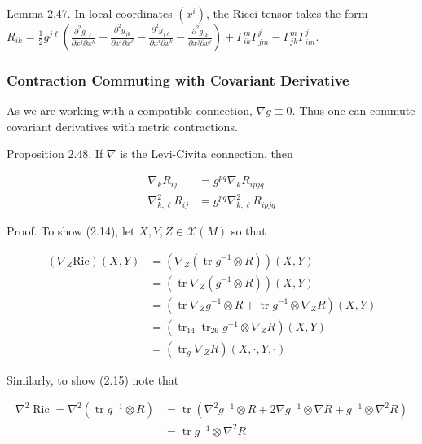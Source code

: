 \documentclass[10pt, letterpaper]{article}
\begin{document}
Lemma 2.47. In local coordinates $\left(x^{i}\right)$, the Ricci tensor takes the form\\
$R_{i k}=\frac{1}{2} g^{j \ell}\left(\frac{\partial^{2} g_{i \ell}}{\partial x^{j} \partial x^{k}}+\frac{\partial^{2} g_{j k}}{\partial x^{i} \partial x^{\ell}}-\frac{\partial^{2} g_{j \ell}}{\partial x^{i} \partial x^{k}}-\frac{\partial^{2} g_{i k}}{\partial x^{j} \partial x^{\ell}}\right)+\Gamma_{i k}^{m} \Gamma_{j m}^{j}-\Gamma_{j k}^{m} \Gamma_{i m}^{j}$.

\subsubsection*{Contraction Commuting with Covariant Derivative}
As we are working with a compatible connection, $\nabla g \equiv 0$. Thus one can commute covariant derivatives with metric contractions.

Proposition 2.48. If $\nabla$ is the Levi-Civita connection, then

$$
\begin{aligned}
\nabla_{k} R_{i j} & =g^{p q} \nabla_{k} R_{i p j q} \\
\nabla_{k, \ell}^{2} R_{i j} & =g^{p q} \nabla_{k, \ell}^{2} R_{i p j q}
\end{aligned}
$$

Proof. To show (2.14), let $X, Y, Z \in \mathscr{X}(M)$ so that

$$
\begin{aligned}
\left(\nabla_{Z} \mathrm{Ric}\right)(X, Y) & =\left(\nabla_{Z}\left(\operatorname{tr} g^{-1} \otimes R\right)\right)(X, Y) \\
& =\left(\operatorname{tr} \nabla_{Z}\left(g^{-1} \otimes R\right)\right)(X, Y) \\
& =\left(\operatorname{tr} \nabla_{Z} g^{-1} \otimes R+\operatorname{tr} g^{-1} \otimes \nabla_{Z} R\right)(X, Y) \\
& =\left(\operatorname{tr}_{14} \operatorname{tr}_{26} g^{-1} \otimes \nabla_{Z} R\right)(X, Y) \\
& =\left(\operatorname{tr}_{g} \nabla_{Z} R\right)(X, \cdot, Y, \cdot)
\end{aligned}
$$

Similarly, to show (2.15) note that

$$
\begin{aligned}
\nabla^{2} \operatorname{Ric}=\nabla^{2}\left(\operatorname{tr} g^{-1} \otimes R\right) & =\operatorname{tr}\left(\nabla^{2} g^{-1} \otimes R+2 \nabla g^{-1} \otimes \nabla R+g^{-1} \otimes \nabla^{2} R\right) \\
& =\operatorname{tr} g^{-1} \otimes \nabla^{2} R
\end{aligned}
$$
\end{document}
